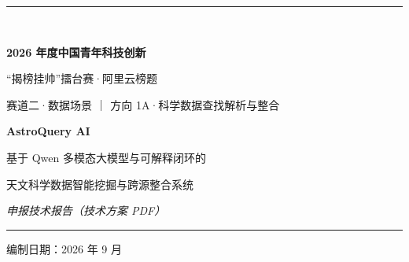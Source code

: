 \documentclass[lang=cn,a4paper,11pt]{elegantpaper}
\begin{document}
\begin{titlepage}
\centering
\vspace*{1.2cm}
{\color{winered}\rule{0.6\textwidth}{1.2pt}}\\[0.8cm]
{\LARGE\bfseries 2026 年度中国青年科技创新\par“揭榜挂帅”擂台赛·阿里云榜题\par}
\vspace{0.8cm}
{\large 赛道二·数据场景 ｜ 方向 1A·科学数据查找解析与整合\par}
\vspace{2.2cm}
{\Huge\bfseries AstroQuery AI\par}
\vspace{0.6cm}
{\LARGE 基于 Qwen 多模态大模型与可解释闭环的\par 天文科学数据智能挖掘与跨源整合系统\par}
\vspace{1.4cm}
{\large\itshape 申报技术报告（技术方案 PDF）\par}
\vspace{0.5cm}
{\color{winered}\rule{0.6\textwidth}{1.2pt}}\par
\vfill
{\large 编制日期：2026 年 9 月\par}
\end{titlepage}

\tableofcontents
\clearpage
{}
\setcounter{page}{1}





\end{document}
